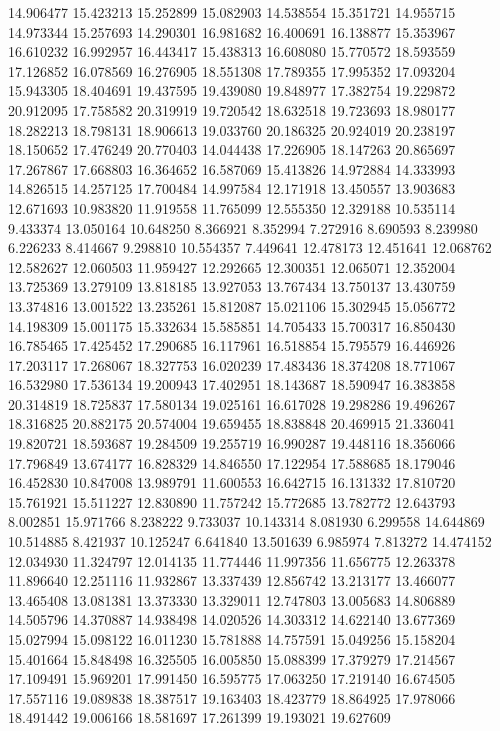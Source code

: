 14.906477
15.423213
15.252899
15.082903
14.538554
15.351721
14.955715
14.973344
15.257693
14.290301
16.981682
16.400691
16.138877
15.353967
16.610232
16.992957
16.443417
15.438313
16.608080
15.770572
18.593559
17.126852
16.078569
16.276905
18.551308
17.789355
17.995352
17.093204
15.943305
18.404691
19.437595
19.439080
19.848977
17.382754
19.229872
20.912095
17.758582
20.319919
19.720542
18.632518
19.723693
18.980177
18.282213
18.798131
18.906613
19.033760
20.186325
20.924019
20.238197
18.150652
17.476249
20.770403
14.044438
17.226905
18.147263
20.865697
17.267867
17.668803
16.364652
16.587069
15.413826
14.972884
14.333993
14.826515
14.257125
17.700484
14.997584
12.171918
13.450557
13.903683
12.671693
10.983820
11.919558
11.765099
12.555350
12.329188
10.535114
9.433374
13.050164
10.648250
8.366921
8.352994
7.272916
8.690593
8.239980
6.226233
8.414667
9.298810
10.554357
7.449641
12.478173
12.451641
12.068762
12.582627
12.060503
11.959427
12.292665
12.300351
12.065071
12.352004
13.725369
13.279109
13.818185
13.927053
13.767434
13.750137
13.430759
13.374816
13.001522
13.235261
15.812087
15.021106
15.302945
15.056772
14.198309
15.001175
15.332634
15.585851
14.705433
15.700317
16.850430
16.785465
17.425452
17.290685
16.117961
16.518854
15.795579
16.446926
17.203117
17.268067
18.327753
16.020239
17.483436
18.374208
18.771067
16.532980
17.536134
19.200943
17.402951
18.143687
18.590947
16.383858
20.314819
18.725837
17.580134
19.025161
16.617028
19.298286
19.496267
18.316825
20.882175
20.574004
19.659455
18.838848
20.469915
21.336041
19.820721
18.593687
19.284509
19.255719
16.990287
19.448116
18.356066
17.796849
13.674177
16.828329
14.846550
17.122954
17.588685
18.179046
16.452830
10.847008
13.989791
11.600553
16.642715
16.131332
17.810720
15.761921
15.511227
12.830890
11.757242
15.772685
13.782772
12.643793
8.002851
15.971766
8.238222
9.733037
10.143314
8.081930
6.299558
14.644869
10.514885
8.421937
10.125247
6.641840
13.501639
6.985974
7.813272
14.474152
12.034930
11.324797
12.014135
11.774446
11.997356
11.656775
12.263378
11.896640
12.251116
11.932867
13.337439
12.856742
13.213177
13.466077
13.465408
13.081381
13.373330
13.329011
12.747803
13.005683
14.806889
14.505796
14.370887
14.938498
14.020526
14.303312
14.622140
13.677369
15.027994
15.098122
16.011230
15.781888
14.757591
15.049256
15.158204
15.401664
15.848498
16.325505
16.005850
15.088399
17.379279
17.214567
17.109491
15.969201
17.991450
16.595775
17.063250
17.219140
16.674505
17.557116
19.089838
18.387517
19.163403
18.423779
18.864925
17.978066
18.491442
19.006166
18.581697
17.261399
19.193021
19.627609
